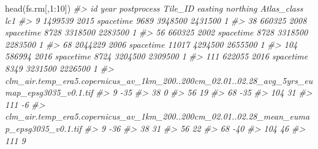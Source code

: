 \documentclass[
  graybox,natbib,nospthms]{svmono}
\newenvironment{Shaded}{\begin{snugshade}}{\end{snugshade}}
\newcommand{\CommentTok}[1]{\textcolor[rgb]{0.37,0.37,0.37}{\textit{#1}}}
\newcommand{\DecValTok}[1]{\textcolor[rgb]{0.06,0.06,0.06}{#1}}
\newcommand{\FunctionTok}[1]{\textcolor[rgb]{0,0,0}{#1}}
\newcommand{\NormalTok}[1]{#1}
\newcommand{\SpecialCharTok}[1]{\textcolor[rgb]{0,0,0}{#1}}
\begin{document}
\begin{Shaded}
\begin{Highlighting}[]
\FunctionTok{head}\NormalTok{(fs.rm[,}\DecValTok{1}\SpecialCharTok{:}\DecValTok{10}\NormalTok{])}
\CommentTok{\#\textgreater{}          id year postprocess Tile\_ID easting northing Atlas\_class lc1}
\CommentTok{\#\textgreater{} 9   1499539 2015   spacetime    9689 3948500  2431500           1    }
\CommentTok{\#\textgreater{} 38   660325 2008   spacetime    8728 3318500  2283500           1    }
\CommentTok{\#\textgreater{} 56   660325 2002   spacetime    8728 3318500  2283500           1    }
\CommentTok{\#\textgreater{} 68  2044229 2006   spacetime   11017 4294500  2655500           1    }
\CommentTok{\#\textgreater{} 104  586994 2016   spacetime    8724 3204500  2309500           1    }
\CommentTok{\#\textgreater{} 111  622055 2016   spacetime    8349 3231500  2226500           1    }
\CommentTok{\#\textgreater{}     clm\_air.temp\_era5.copernicus\_av\_1km\_200..200cm\_02.01..02.28\_avg\_5yrs\_eumap\_epsg3035\_v0.1.tif}
\CommentTok{\#\textgreater{} 9                                                                                            {-}35}
\CommentTok{\#\textgreater{} 38                                                                                             0}
\CommentTok{\#\textgreater{} 56                                                                                            19}
\CommentTok{\#\textgreater{} 68                                                                                           {-}35}
\CommentTok{\#\textgreater{} 104                                                                                           31}
\CommentTok{\#\textgreater{} 111                                                                                           {-}6}
\CommentTok{\#\textgreater{}     clm\_air.temp\_era5.copernicus\_av\_1km\_200..200cm\_02.01..02.28\_mean\_eumap\_epsg3035\_v0.1.tif}
\CommentTok{\#\textgreater{} 9                                                                                        {-}36}
\CommentTok{\#\textgreater{} 38                                                                                        31}
\CommentTok{\#\textgreater{} 56                                                                                        22}
\CommentTok{\#\textgreater{} 68                                                                                       {-}40}
\CommentTok{\#\textgreater{} 104                                                                                       46}
\CommentTok{\#\textgreater{} 111                                                                                        9}
\end{Highlighting}
\end{Shaded}
\end{document}
